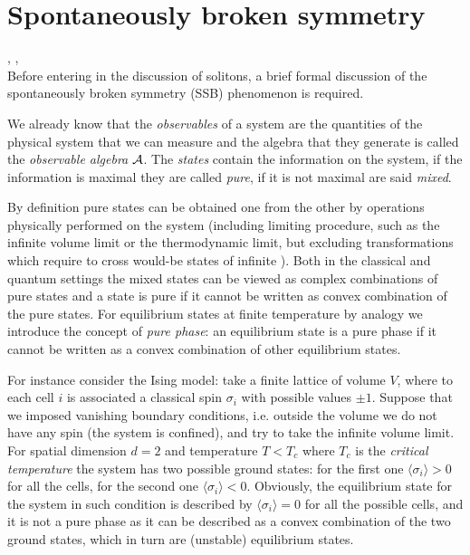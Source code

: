 \documentclass[../main/main.tex]{subfiles}
\begin{document}
\section{Spontaneously broken symmetry}

\cite[Chapter C.1]{Strocchi_1985}, \cite{Strocchi:2012}, \cite[Chapter 1]{Shifman:2012}\\

Before entering in the discussion of solitons, a brief formal discussion of the spontaneously broken symmetry (SSB) phenomenon is required. 

We already know that the \emph{observables} of a system are the quantities of the physical system that we can measure and the algebra that they generate is called the \emph{observable algebra} $\mathcal A$. The \emph{states} contain the information on the system, if the information is maximal they are called \emph{pure}, if it is not maximal are said \emph{mixed}. 

By definition pure states can be obtained one from the other by operations physically performed on the system (including limiting procedure, such as the infinite volume limit or the thermodynamic limit, but excluding transformations which require to cross would-be states of infinite ). Both in the classical and quantum settings the mixed states can be viewed as complex combinations of pure states and a state is pure if it cannot be written as convex combination of the pure states. 
For equilibrium states at finite temperature by analogy we introduce the concept of \emph{pure phase}: an equilibrium state is a pure phase if it cannot be written as a convex combination of other equilibrium states.

\skipline

For instance consider the Ising model: take a finite lattice of volume $V$, where to each cell $i$ is associated a classical spin $\sigma_i$ with possible values $\pm1$. Suppose that we imposed vanishing boundary conditions, i.e. outside the volume we do not have any spin (the system is confined), and try to take the infinite volume limit. For spatial dimension $d=2$ and temperature $T<T_c$ where $T_c$ is the \emph{critical temperature} the system has two possible ground states: for the first one $\langle\sigma_i\rangle>0$ for all the cells, for the second one $\langle\sigma_i\rangle<0$. Obviously, the equilibrium state for the system in such condition is described by $\langle\sigma_i\rangle =0$ for all the possible cells, and it is not a pure phase as it can be described as a convex combination of the two ground states, which in turn are (unstable) equilibrium states. 
\end{document}

